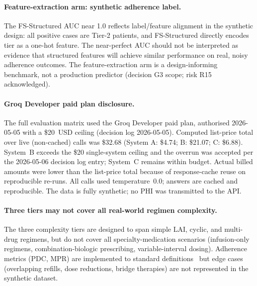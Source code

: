 \paragraph{Feature-extraction arm: synthetic adherence label.}
The FS-Structured AUC near 1.0 reflects label/feature alignment in the synthetic design:
all positive cases are Tier-2 patients, and FS-Structured directly encodes tier as a
one-hot feature.  The near-perfect AUC should not be interpreted as evidence that
structured features will achieve similar performance on real, noisy adherence outcomes.
The feature-extraction arm is a design-informing benchmark, not a production predictor
(decision G3 scope; risk R15 acknowledged).

\paragraph{Groq Developer paid plan disclosure.}
The full evaluation matrix used the Groq Developer paid plan, authorised 2026-05-05 with
a \$20~USD ceiling (decision log 2026-05-05).  Computed list-price total over live
(non-cached) calls was \$32.68 (System A: \$4.74; B: \$21.07; C: \$6.88).  System~B
exceeds the \$20 single-system ceiling and the overrun was accepted per the 2026-05-06
decision log entry; System~C remains within budget.  Actual billed amounts were lower
than the list-price total because of response-cache reuse on reproducible re-runs.
All calls used temperature~0.0; answers are cached and reproducible.  The data is
fully synthetic; no PHI was transmitted to the API.

\paragraph{Three tiers may not cover all real-world regimen complexity.}
The three complexity tiers are designed to span simple LAI, cyclic, and multi-drug
regimens, but do not cover all specialty-medication scenarios (infusion-only regimens,
combination-biologic prescribing, variable-interval dosing).  Adherence metrics
(PDC, MPR) are implemented to standard definitions~\citep{lociganic2015using} but edge
cases (overlapping refills, dose reductions, bridge therapies) are not represented in
the synthetic dataset.
